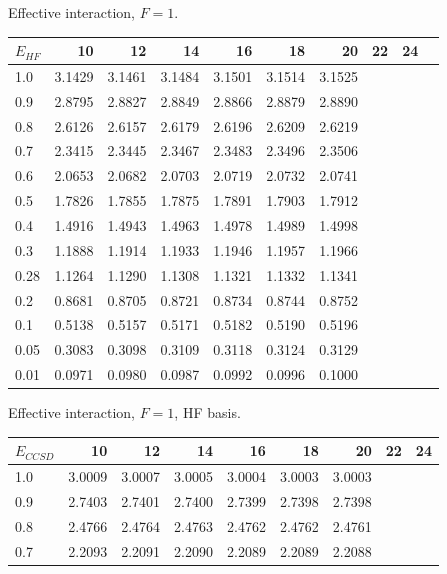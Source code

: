  
\begin{landscape}
\begin{table}
\begin{center}
Effective interaction, $F=1$.\\
\begin{tabular}{l|rrrrrrrrr}
\hline 
$E_{HF}$ & 10 & 12 & 14 & 16 & 18 & 20 & 22 & 24\\ 
\hline \hline
1.0 & 3.1429 & 3.1461 & 3.1484 & 3.1501 & 3.1514 & 3.1525  \\ 
0.9 & 2.8795 & 2.8827 & 2.8849 & 2.8866 & 2.8879 & 2.8890  \\ 
0.8 & 2.6126 & 2.6157 & 2.6179 & 2.6196 & 2.6209 & 2.6219  \\ 
0.7 & 2.3415 & 2.3445 & 2.3467 & 2.3483 & 2.3496 & 2.3506  \\ 
0.6 & 2.0653 & 2.0682 & 2.0703 & 2.0719 & 2.0732 & 2.0741  \\ 
0.5 & 1.7826 & 1.7855 & 1.7875 & 1.7891 & 1.7903 & 1.7912  \\ 
0.4 & 1.4916 & 1.4943 & 1.4963 & 1.4978 & 1.4989 & 1.4998  \\ 
0.3 & 1.1888 & 1.1914 & 1.1933 & 1.1946 & 1.1957 & 1.1966  \\ 
0.28 & 1.1264 & 1.1290 & 1.1308 & 1.1321 & 1.1332 & 1.1341  \\ 
0.2 & 0.8681 & 0.8705 & 0.8721 & 0.8734 & 0.8744 & 0.8752  \\ 
0.1 & 0.5138 & 0.5157 & 0.5171 & 0.5182 & 0.5190 & 0.5196  \\ 
0.05 & 0.3083 & 0.3098 & 0.3109 & 0.3118 & 0.3124 & 0.3129  \\ 
0.01 & 0.0971 & 0.0980 & 0.0987 & 0.0992 & 0.0996 & 0.1000  \\ 
\hline \hline
\end{tabular} 
\end{center}
\begin{center}
Effective interaction, $F=1$, HF basis.\\
\begin{tabular}{l|rrrrrrrr}
\hline 
$E_{CCSD}$ & 10 & 12 & 14 & 16 & 18 & 20 & 22 & 24\\
\hline \hline
1.0 & 3.0009 & 3.0007 & 3.0005 & 3.0004 & 3.0003 & 3.0003  \\ 
0.9 & 2.7403 & 2.7401 & 2.7400 & 2.7399 & 2.7398 & 2.7398  \\ 
0.8 & 2.4766 & 2.4764 & 2.4763 & 2.4762 & 2.4762 & 2.4761  \\ 
0.7 & 2.2093 & 2.2091 & 2.2090 & 2.2089 & 2.2089 & 2.2088  \\ 

\end{tabular}
\end{center}
\end{table}
\end{landscape}

